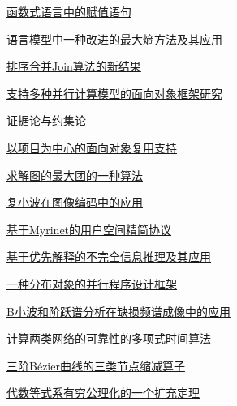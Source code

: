 \documentclass[a4paper]{article}
\begin{document}
\href{http://www.jos.org.cn/ch/reader/download_pdf.aspx?file_no=19990306&year_id=1999&quarter_id=3&falg=1}{函数式语言中的赋值语句}

\href{http://www.jos.org.cn/ch/reader/download_pdf.aspx?file_no=19990307&year_id=1999&quarter_id=3&falg=1}{语言模型中一种改进的最大熵方法及其应用}

\href{http://www.jos.org.cn/ch/reader/download_pdf.aspx?file_no=19990308&year_id=1999&quarter_id=3&falg=1}{排序合并Join算法的新结果}

\href{http://www.jos.org.cn/ch/reader/download_pdf.aspx?file_no=19990309&year_id=1999&quarter_id=3&falg=1}{支持多种并行计算模型的面向对象框架研究}

\href{http://www.jos.org.cn/ch/reader/download_pdf.aspx?file_no=19990310&year_id=1999&quarter_id=3&falg=1}{证据论与约集论}

\href{http://www.jos.org.cn/ch/reader/download_pdf.aspx?file_no=19990311&year_id=1999&quarter_id=3&falg=1}{以项目为中心的面向对象复用支持}

\href{http://www.jos.org.cn/ch/reader/download_pdf.aspx?file_no=19990312&year_id=1999&quarter_id=3&falg=1}{求解图的最大团的一种算法}

\href{http://www.jos.org.cn/ch/reader/download_pdf.aspx?file_no=19990313&year_id=1999&quarter_id=3&falg=1}{复小波在图像编码中的应用}

\href{http://www.jos.org.cn/ch/reader/download_pdf.aspx?file_no=19990314&year_id=1999&quarter_id=3&falg=1}{基于Myrinet的用户空间精简协议}

\href{http://www.jos.org.cn/ch/reader/download_pdf.aspx?file_no=19990315&year_id=1999&quarter_id=3&falg=1}{基于优先解释的不完全信息推理及其应用}

\href{http://www.jos.org.cn/ch/reader/download_pdf.aspx?file_no=19990316&year_id=1999&quarter_id=3&falg=1}{一种分布对象的并行程序设计框架}

\href{http://www.jos.org.cn/ch/reader/download_pdf.aspx?file_no=19990317&year_id=1999&quarter_id=3&falg=1}{B小波和阶跃谱分析在缺损频谱成像中的应用}

\href{http://www.jos.org.cn/ch/reader/download_pdf.aspx?file_no=19990318&year_id=1999&quarter_id=3&falg=1}{计算两类网络的可靠性的多项式时间算法}

\href{http://www.jos.org.cn/ch/reader/download_pdf.aspx?file_no=19990319&year_id=1999&quarter_id=3&falg=1}{三阶Bézier曲线的三类节点缩减算子}

\href{http://www.jos.org.cn/ch/reader/download_pdf.aspx?file_no=19990320&year_id=1999&quarter_id=3&falg=1}{代数等式系有穷公理化的一个扩充定理}
\end{document}
